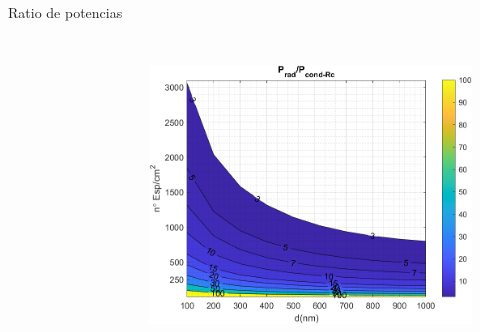 \documentclass[spanish,a4paper]{beamer}%
\begin{document}
\begin{frame}{Ratio de potencias}
\begin{columns}
\begin{minipage}[c]{.9\columnwidth}
\begin{figure}[h]
								\label{fig:SiSiO2Ge_relRc}%
						\end{figure}
						\end{minipage}
						\hfill \vfill
						\begin{minipage}[c]{.9\columnwidth}
						\begin{figure}[h]%
								\centering
										\includegraphics[width=0.81\columnwidth]{SiGe_Rc_full}
								\label{fig:SiSiO2Ge_relfullRc}%
						\end{figure}
						\end{minipage}
				\end{columns}		
	\end{frame}
	
\end{document}
